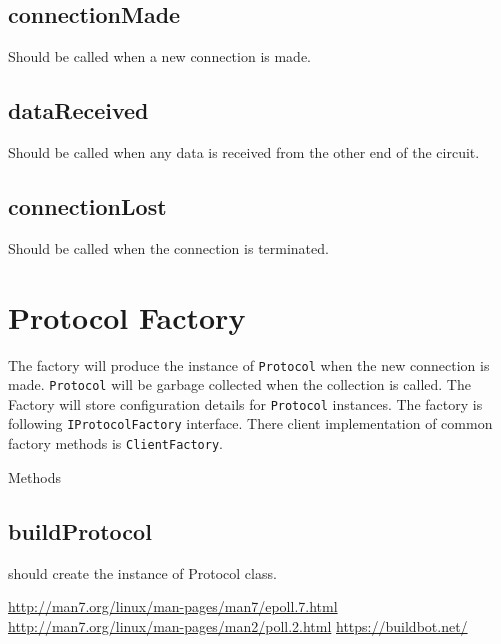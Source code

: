 \documentclass{article}
\begin{document}
    \subsection{connectionMade} Should be called when a new connection is made.

    \subsection{dataReceived} Should be called when any data is received from
    the other end of the circuit.

    \subsection{connectionLost} Should be called when the connection is
    terminated.

  \section{Protocol Factory}
    The factory will produce the instance of \texttt{Protocol} when the new
    connection is made. \texttt{Protocol} will be garbage collected when the
    collection is called. The Factory will store configuration details for
    \texttt{Protocol} instances. The factory is following
    \texttt{IProtocolFactory} interface. There client implementation of common
    factory methods is \texttt{ClientFactory}.

    Methods

    \subsection{buildProtocol} should create the instance of Protocol class.

  \begin{thebibliography}{2}
      \url{http://man7.org/linux/man-pages/man7/epoll.7.html}%
      \url{http://man7.org/linux/man-pages/man2/poll.2.html}%
      \url{https://buildbot.net/} %

  \end{thebibliography}
\end{document}
